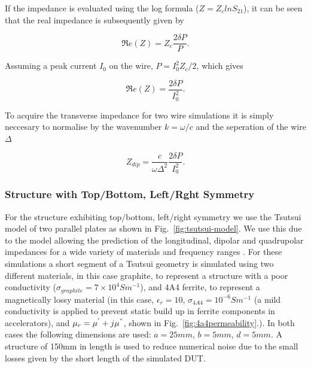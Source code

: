 If the impedance is evaluated using the log formula ($Z = Z_{c}ln S_{21}$), it can be seen that the real impedance is subsequently given by

\begin{equation}
\Re{}e \left( Z \right) = Z_{c} \frac{2 \delta P}{P}.
\end{equation}

Assuming a peak current $I_{0}$ on the wire, $P = I_{0}^{2}Z_{c}/2$, which gives

\begin{equation}
\Re{}e \left( Z \right) = \frac{2 \delta P}{I_{0}^{2}}.
\end{equation}

To acquire the transverse impedance for two wire simulations it is simply neccesary to normalise by the wavenumber $k=\omega / c$ and the seperation of the wire $\Delta$ 

\begin{equation}
Z_{dip} = \frac{c}{\omega \Delta^{2}} \frac{2 \delta P}{I_{0}^{2}}.
\end{equation}

\subsubsection{Structure with Top/Bottom, Left/Rght Symmetry}

For the structure exhibiting top/bottom, left/right symmetry we use the Tsutsui model of two parallel plates as shown in Fig.~\ref{fig:tsutsui-model}. We use this due to the model allowing the prediction of the longitudinal, dipolar and quadrupolar impedances for a wide variety of materials and frequency ranges \cite{Tsutsui:ferrKickLong,Tsutsui:DipoleKicker, Salvant:QuadKicker}. For these simulations a short segment of a Tsutsui geometry is simulated using two different materials, in this case graphite, to represent a structure with a poor conductivity ($\sigma_{graphite} = 7 \times 10^{4} S m^{-1}$), and 4A4 ferrite, to represent a magnetically lossy material (in this case, $\epsilon_{r} = 10$, $\sigma_{4A4} = 10^{-6} S m^{-1}$ (a mild conductivity is applied to prevent static build up in ferrite components in accelerators), and $\mu_{r} = \mu^{'} + j \mu^{"}$, shown in Fig.~\ref{fig:4a4permeability}.). In both cases the following dimensions are used: $a=25mm$, $b=5mm$, $d=5mm$. A structure of 150mm in length is used to reduce numerical noise due to the small losses given by the short length of the simulated DUT.


